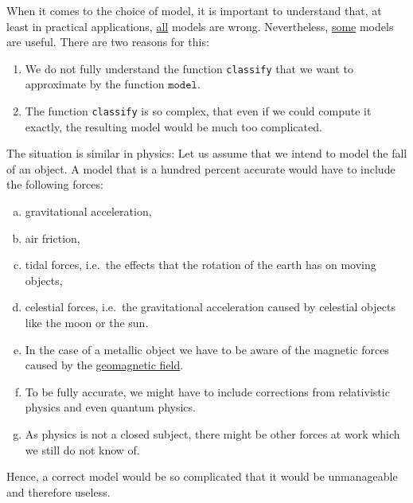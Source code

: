When it comes to the choice of model, it is important to understand that, at least in practical applications,
\underline{all} models are wrong.  Nevertheless, \underline{some} models are useful.  There are two reasons for this:
\begin{enumerate}
\item We do not fully understand the function \texttt{classify} that we want to approximate by the function $\mathtt{model}$.
\item The function \texttt{classify} is so complex, that even if we could compute it exactly, the resulting model 
      would be much too complicated.
\end{enumerate}
The situation is similar in physics: Let us assume that we intend to model the fall of an object.  A model that is a
hundred percent accurate would have to include the following forces:
\begin{enumerate}[(a)]
\item gravitational acceleration,
\item air friction, 
\item tidal forces, i.e.~the effects that the rotation of the earth has on moving objects,
\item celestial forces, i.e.~the gravitational acceleration caused by celestial objects like the moon or the
      sun.
\item In the case of a metallic object we have to be aware of the magnetic forces
      caused by the \href{https://www.britannica.com/science/geomagnetic-field}{geomagnetic field}.
\item To be fully accurate, we might have to include corrections from relativistic physics and even quantum
      physics.   
\item As physics is not a closed subject, there might be other forces at work which we still do not know of. 
\end{enumerate}
Hence, a correct model would be so complicated that it would be unmanageable and therefore useless. 

